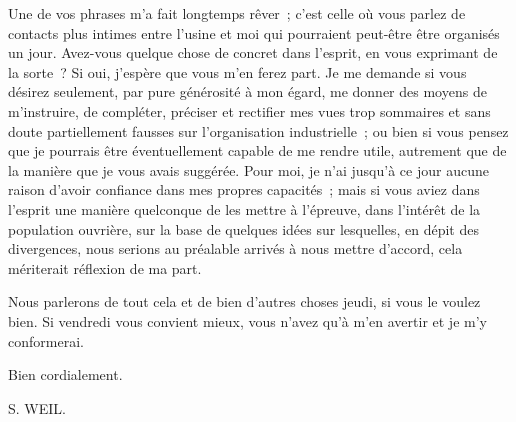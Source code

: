 \documentclass[french,twoside]{book} %
\begin{document}
Une de vos phrases m'a fait longtemps rêver ; c'est celle où vous parlez de contacts plus intimes entre l'usine et moi qui pourraient peut-être être organisés un jour. Avez-vous quelque chose de concret dans l'esprit, en vous exprimant de la sorte ? Si oui, j'espère que vous m'en ferez part. Je me demande si vous désirez seulement, par pure générosité à mon égard, me donner des moyens de m'instruire, de compléter, préciser et rectifier mes vues trop sommaires et sans doute partiellement fausses sur l'organisation industrielle ; ou bien si vous pensez que je pourrais être éventuellement capable de me rendre utile, autrement que de la manière que je vous avais suggérée. Pour moi, je n'ai jusqu'à ce jour aucune raison d'avoir confiance dans mes propres capacités ; mais si vous aviez dans l'esprit une manière quelconque de les mettre à l'épreuve, dans l'intérêt de la population ouvrière, sur la base de quelques idées sur lesquelles, en dépit des divergences, nous serions au préalable arrivés à nous mettre d'accord, cela mériterait réflexion de ma part.\par
Nous parlerons de tout cela et de bien d'autres choses jeudi, si vous le voulez bien. Si vendredi vous convient mieux, vous n'avez qu'à m'en avertir et je m'y conformerai.\par
Bien cordialement.\par
S. WEIL.\par
\end{document}

